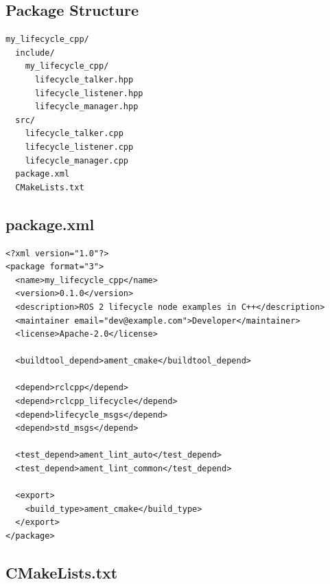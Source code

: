 \documentclass[12pt,a4paper]{article}
\begin{document}
\subsection{Package Structure}

\begin{lstlisting}[style=bash,caption={C++ package layout}]
my_lifecycle_cpp/
  include/
    my_lifecycle_cpp/
      lifecycle_talker.hpp
      lifecycle_listener.hpp
      lifecycle_manager.hpp
  src/
    lifecycle_talker.cpp
    lifecycle_listener.cpp
    lifecycle_manager.cpp
  package.xml
  CMakeLists.txt
\end{lstlisting}

\subsection{package.xml}

\begin{lstlisting}[style=xml,caption={package.xml for the C++ package}]
<?xml version="1.0"?>
<package format="3">
  <name>my_lifecycle_cpp</name>
  <version>0.1.0</version>
  <description>ROS 2 lifecycle node examples in C++</description>
  <maintainer email="dev@example.com">Developer</maintainer>
  <license>Apache-2.0</license>

  <buildtool_depend>ament_cmake</buildtool_depend>

  <depend>rclcpp</depend>
  <depend>rclcpp_lifecycle</depend>
  <depend>lifecycle_msgs</depend>
  <depend>std_msgs</depend>

  <test_depend>ament_lint_auto</test_depend>
  <test_depend>ament_lint_common</test_depend>

  <export>
    <build_type>ament_cmake</build_type>
  </export>
</package>
\end{lstlisting}

\subsection{CMakeLists.txt}
\end{document}
